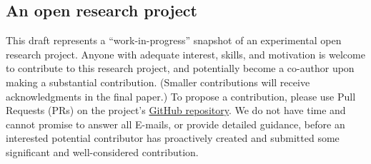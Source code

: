 

\subsection*{An open research project}

This draft represents a ``work-in-progress'' snapshot
of an experimental open research project.
Anyone with adequate interest, skills, and motivation
is welcome to contribute to this research project,
and potentially become a co-author upon making a substantial contribution.
(Smaller contributions will receive acknowledgments in the final paper.)
To propose a contribution, please use Pull Requests (PRs)
on the project's \href{https://github.com/dedis/matchertext}{GitHub repository}.
We do not have time and cannot promise to answer all E-mails,
or provide detailed guidance,
before an interested potential contributor has proactively
created and submitted some significant and well-considered contribution.

